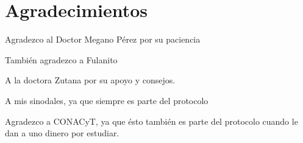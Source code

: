 \documentclass[11pt, twoside]{book}
\begin{document}
\chapter*{Agradecimientos} 

Agradezco al Doctor Megano Pérez por su paciencia 
\medskip

También agradezco a Fulanito
\medskip

A la doctora Zutana  por su apoyo y consejos.
\medskip

A mis sinodales, ya que siempre es parte del protocolo
\medskip

Agradezco a CONACyT, ya que ésto también es parte del protocolo cuando le dan a
uno dinero por estudiar.
\end{document}
